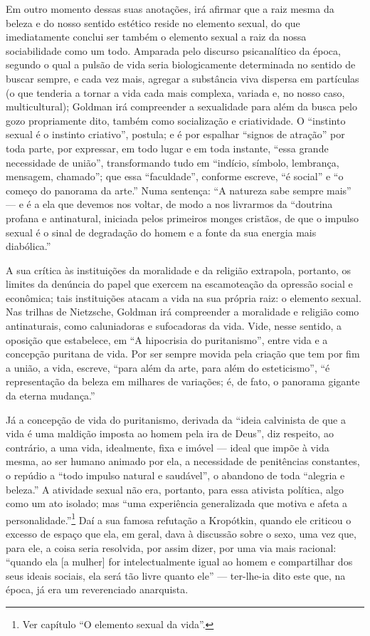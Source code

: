 Em outro momento dessas
suas anotações, irá afirmar que a raiz mesma da beleza e do nosso
sentido estético reside no elemento sexual, do que imediatamente conclui
ser também o elemento sexual a raiz da nossa sociabilidade como um todo.
Amparada pelo discurso psicanalítico da época, segundo o qual a pulsão
de vida seria biologicamente determinada no sentido de buscar sempre, e
cada vez mais, agregar a substância viva dispersa em partículas (o que
tenderia a tornar a vida cada mais complexa, variada e, no nosso caso,
multicultural); Goldman irá compreender a sexualidade para além da busca
pelo gozo propriamente dito, também como socialização e criatividade. O
``instinto sexual é o instinto criativo'', postula; e é por espalhar
``signos de atração'' por toda parte, por expressar, em todo lugar e em
toda instante, ``essa grande necessidade de união'', transformando tudo
em ``indício, símbolo, lembrança, mensagem, chamado''; que essa
``faculdade'', conforme escreve, ``é social'' e ``o começo do panorama
da arte.'' Numa sentença: ``A natureza sabe sempre mais'' --- e é a ela
que devemos nos voltar, de modo a nos livrarmos da ``doutrina profana e
antinatural, iniciada pelos primeiros monges cristãos, de que o impulso
sexual é o sinal de degradação do homem e a fonte da sua energia mais
diabólica.''

A sua crítica às instituições da moralidade e da religião extrapola,
portanto, os limites da denúncia do papel que exercem na escamoteação da
opressão social e econômica; tais instituições atacam a vida na sua
própria raiz: o elemento sexual. Nas trilhas de Nietzsche, Goldman
irá compreender a moralidade e religião como antinaturais, como
caluniadoras e sufocadoras da vida. Vide, nesse sentido, a oposição que
estabelece, em ``A hipocrisia do puritanismo'', entre vida e a concepção
puritana de vida. Por ser sempre movida pela criação que tem por fim a
união, a vida, escreve, ``para além da arte, para além do esteticismo'',
``é representação da beleza em milhares de variações; é, de fato, o
panorama gigante da eterna mudança.''

Já a concepção de vida do
puritanismo, derivada da ``ideia calvinista de que a vida é uma maldição
imposta ao homem pela ira de Deus'', diz respeito, ao contrário, a uma
vida, idealmente, fixa e imóvel --- ideal que impõe à vida mesma, ao
ser humano animado por ela, a necessidade de penitências constantes, o
repúdio a ``todo impulso natural e saudável'', o abandono de toda
``alegria e beleza.'' A atividade sexual não era, portanto, para
essa ativista política, algo como um ato isolado; mas ``uma
experiência generalizada que motiva e afeta a personalidade.''\footnote{Ver capítulo ``O
elemento sexual da vida''.} Daí a sua famosa refutação a Kropótkin,
quando ele criticou o excesso de espaço que ela, em geral, dava à
discussão sobre o sexo, uma vez que, para ele, a coisa seria resolvida,
por assim dizer, por uma via mais racional: ``quando ela {[}a mulher{]}
for intelectualmente igual ao homem e compartilhar dos seus ideais
sociais, ela será tão livre quanto ele'' --- ter-lhe-ia dito este que, na
época, já era um reverenciado anarquista. 

